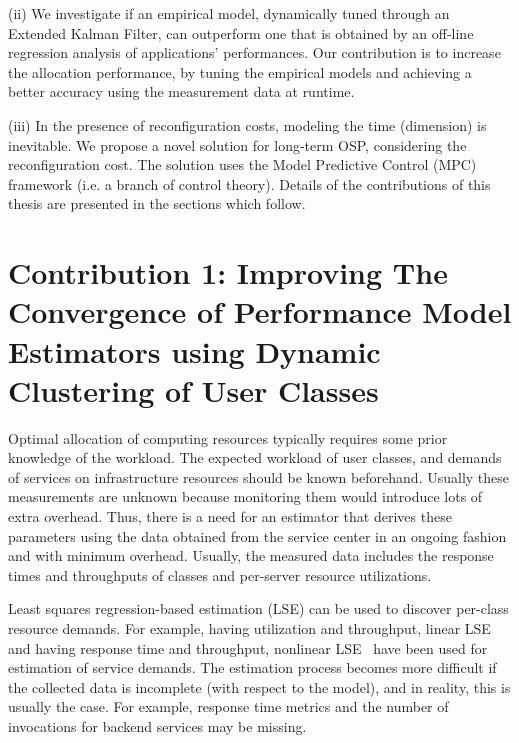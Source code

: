 (ii) We investigate if an empirical model, dynamically tuned through an Extended Kalman Filter, can outperform one that is obtained by an off-line regression analysis of applications' performances. %
Our contribution is to increase the allocation performance, by tuning the empirical models and achieving a better accuracy using the measurement data at runtime.  

(iii) In the presence of reconfiguration costs, modeling the time (dimension) is inevitable.
We propose a novel solution for long-term OSP, considering the reconfiguration cost. The solution uses the Model Predictive Control (MPC) framework (i.e. a branch of control theory).
Details of the contributions of this thesis are presented in the sections which follow.

 \section{Contribution 1: Improving The Convergence of Performance Model Estimators using Dynamic Clustering of User Classes}
 Optimal allocation of computing resources typically requires some prior knowledge of the workload.
The expected workload of user classes, and demands of services on infrastructure resources should be known beforehand. Usually these measurements are unknown because monitoring them would introduce lots of extra overhead. 
Thus, there is a need for an estimator that derives these parameters using the data obtained from the service center in an ongoing fashion and with minimum overhead. Usually, the measured data includes the response times and throughputs of classes and per-server resource utilizations.

Least squares regression-based estimation (LSE) can be used to discover per-class resource demands. For example, having utilization and throughput, linear LSE \cite{pacifici_cpu_2008} and having response time and throughput, nonlinear LSE~\cite{menasce2008computing,rolia_parameter_1995,zhang_regression-based_2007,rolia_correlating_1998} have been used for estimation of service demands. The estimation process becomes more difficult if the collected data is incomplete (with respect to the model), and in reality, this is usually the case. For example, response time metrics and the number of invocations for backend services may be missing. %

